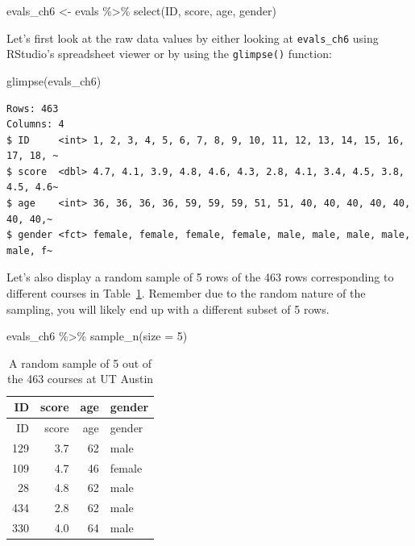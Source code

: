 \documentclass[
  letterpaper,
  DIV=11,
  numbers=noendperiod]{scrreprt}
\newenvironment{Shaded}{\begin{snugshade}}{\end{snugshade}}
\newcommand{\AttributeTok}[1]{\textcolor[rgb]{0.40,0.45,0.13}{#1}}
\newcommand{\DecValTok}[1]{\textcolor[rgb]{0.68,0.00,0.00}{#1}}
\newcommand{\FunctionTok}[1]{\textcolor[rgb]{0.28,0.35,0.67}{#1}}
\newcommand{\NormalTok}[1]{\textcolor[rgb]{0.00,0.23,0.31}{#1}}
\newcommand{\OtherTok}[1]{\textcolor[rgb]{0.00,0.23,0.31}{#1}}
\newcommand{\SpecialCharTok}[1]{\textcolor[rgb]{0.37,0.37,0.37}{#1}}
\theoremstyle{definition}
\theoremstyle{remark}
\begin{document}
\begin{Shaded}
\begin{Highlighting}[]
\NormalTok{evals\_ch6 }\OtherTok{\textless{}{-}}\NormalTok{ evals }\SpecialCharTok{\%\textgreater{}\%}
  \FunctionTok{select}\NormalTok{(ID, score, age, gender)}
\end{Highlighting}
\end{Shaded}

Let's first look at the raw data values by either looking at
\texttt{evals\_ch6} using RStudio's spreadsheet viewer or by using the
\texttt{glimpse()} function:

\begin{Shaded}
\begin{Highlighting}[]
\FunctionTok{glimpse}\NormalTok{(evals\_ch6)}
\end{Highlighting}
\end{Shaded}

\begin{verbatim}
Rows: 463
Columns: 4
$ ID     <int> 1, 2, 3, 4, 5, 6, 7, 8, 9, 10, 11, 12, 13, 14, 15, 16, 17, 18, ~
$ score  <dbl> 4.7, 4.1, 3.9, 4.8, 4.6, 4.3, 2.8, 4.1, 3.4, 4.5, 3.8, 4.5, 4.6~
$ age    <int> 36, 36, 36, 36, 59, 59, 59, 51, 51, 40, 40, 40, 40, 40, 40, 40,~
$ gender <fct> female, female, female, female, male, male, male, male, male, f~
\end{verbatim}

Let's also display a random sample of 5 rows of the 463 rows
corresponding to different courses in
Table~\ref{tbl-model4-data-preview}. Remember due to the random nature
of the sampling, you will likely end up with a different subset of 5
rows.

\begin{Shaded}
\begin{Highlighting}[]
\NormalTok{evals\_ch6 }\SpecialCharTok{\%\textgreater{}\%}
  \FunctionTok{sample\_n}\NormalTok{(}\AttributeTok{size =} \DecValTok{5}\NormalTok{)}
\end{Highlighting}
\end{Shaded}

\hypertarget{tbl-model4-data-preview}{}
\begin{longtable}[]{@{}rrrl@{}}
\caption{\label{tbl-model4-data-preview}A random sample of 5 out of the
463 courses at UT Austin}\tabularnewline
\toprule()
ID & score & age & gender \\
\midrule()
\endfirsthead
\toprule()
ID & score & age & gender \\
\midrule()
\endhead
129 & 3.7 & 62 & male \\
109 & 4.7 & 46 & female \\
28 & 4.8 & 62 & male \\
434 & 2.8 & 62 & male \\
330 & 4.0 & 64 & male \\
\bottomrule()
\end{longtable}
\end{document}
